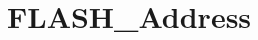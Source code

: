 \hypertarget{group___f_l_a_s_h___address}{\section{F\-L\-A\-S\-H\-\_\-\-Address}
\label{group___f_l_a_s_h___address}
}
